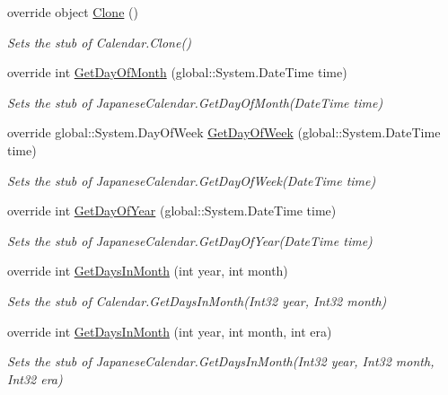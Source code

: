 \begin{DoxyCompactItemize}
override object \hyperlink{class_system_1_1_globalization_1_1_fakes_1_1_stub_japanese_calendar_a648cb7586dd5e76049815365a0f23cfe}{Clone} ()
\begin{DoxyCompactList}\small\item\em Sets the stub of Calendar.\-Clone()\end{DoxyCompactList}\item 
override int \hyperlink{class_system_1_1_globalization_1_1_fakes_1_1_stub_japanese_calendar_a2f4227566c9751aa33fe5c9bb83b86a3}{Get\-Day\-Of\-Month} (global\-::\-System.\-Date\-Time time)
\begin{DoxyCompactList}\small\item\em Sets the stub of Japanese\-Calendar.\-Get\-Day\-Of\-Month(\-Date\-Time time)\end{DoxyCompactList}\item 
override global\-::\-System.\-Day\-Of\-Week \hyperlink{class_system_1_1_globalization_1_1_fakes_1_1_stub_japanese_calendar_a411ada2266848cb6ae72ad682e4c99ef}{Get\-Day\-Of\-Week} (global\-::\-System.\-Date\-Time time)
\begin{DoxyCompactList}\small\item\em Sets the stub of Japanese\-Calendar.\-Get\-Day\-Of\-Week(\-Date\-Time time)\end{DoxyCompactList}\item 
override int \hyperlink{class_system_1_1_globalization_1_1_fakes_1_1_stub_japanese_calendar_ac88662b9b394d68b9f4c17396173e2ad}{Get\-Day\-Of\-Year} (global\-::\-System.\-Date\-Time time)
\begin{DoxyCompactList}\small\item\em Sets the stub of Japanese\-Calendar.\-Get\-Day\-Of\-Year(\-Date\-Time time)\end{DoxyCompactList}\item 
override int \hyperlink{class_system_1_1_globalization_1_1_fakes_1_1_stub_japanese_calendar_a36b635f9195af3809a87aeaf3ca018d9}{Get\-Days\-In\-Month} (int year, int month)
\begin{DoxyCompactList}\small\item\em Sets the stub of Calendar.\-Get\-Days\-In\-Month(\-Int32 year, Int32 month)\end{DoxyCompactList}\item 
override int \hyperlink{class_system_1_1_globalization_1_1_fakes_1_1_stub_japanese_calendar_afec042069bf97ef60ff6d5e098d4d4a7}{Get\-Days\-In\-Month} (int year, int month, int era)
\begin{DoxyCompactList}\small\item\em Sets the stub of Japanese\-Calendar.\-Get\-Days\-In\-Month(\-Int32 year, Int32 month, Int32 era)\end{DoxyCompactList}\item 

\end{DoxyCompactItemize}
